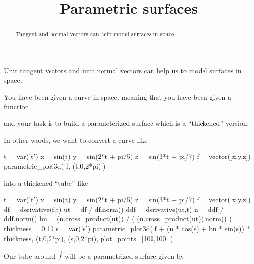 \documentclass{ximera}
\title[Dig-In:]{Parametric surfaces}
\begin{document}
\begin{abstract}
  Tangent and normal vectors can help model surfaces in space.
\end{abstract}
\maketitle

Unit tangent vectors and unit normal vectors can help us to model
surfaces in space.

\begin{example}
  You have been given a curve in space, meaning that you have been given a function
  \begin{multipleChoice}
  \end{multipleChoice}
  and your task is to build a parameterized surface which is a ``thickened'' version.

  In other words, we want to convert a curve like
  \begin{sageOutput}
t = var('t')
x = sin(t)
y = sin(2*t + pi/5)
z = sin(3*t + pi/7)
f = vector([x,y,z])
parametric_plot3d( f, (t,0,2*pi) )
  \end{sageOutput}
  into a thickened ``tube'' like
  \begin{sageOutput}
t = var('t')
x = sin(t)
y = sin(2*t + pi/5)
z = sin(3*t + pi/7)
f = vector([x,y,z])
df = derivative(f,t)
ut = df / df.norm()
ddf = derivative(ut,t)
n = ddf / ddf.norm()
bn = (n.cross_product(ut)) / ( (n.cross_product(ut)).norm() )
thickness = 0.10
s = var('s')
parametric_plot3d( f + (n * cos(s) + bn * sin(s)) * thickness, (t,0,2*pi), (s,0,2*pi), plot_points=[100,100] )
  \end{sageOutput}

  Our tube around $\vec{f}$ will be a parametrized surface given by 
  \begin{multipleChoice}
  \end{multipleChoice}


\end{example}
\end{document}
